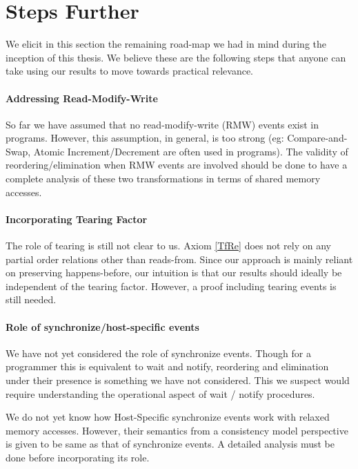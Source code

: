 \section{Steps Further}

    We elicit in this section the remaining road-map we had in mind during the inception of this thesis. 
    We believe these are the following steps that anyone can take using our results to move towards practical relevance.

    \paragraph{Addressing Read-Modify-Write}
        So far we have assumed that no read-modify-write (RMW) events exist in programs.
        However, this assumption, in general, is too strong (eg: Compare-and-Swap, Atomic Increment/Decrement are often used in programs).
        The validity of reordering/elimination when RMW events are involved should be done to have a complete analysis of these two transformations in terms of shared memory accesses.

    \paragraph{Incorporating Tearing Factor}
        The role of tearing is still not clear to us.
        Axiom \ref{TfRe} does not rely on any partial order relations other than reads-from. 
        Since our approach is mainly reliant on preserving happens-before, our intuition is that our results should ideally be independent of the tearing factor.
        However, a proof including tearing events is still needed.   
  
    \paragraph{Role of synchronize/host-specific events}
        We have not yet considered the role of synchronize events. 
        Though for a programmer this is equivalent to wait and notify, reordering and elimination under their presence is something we have not considered. 
        This we suspect would require understanding the operational aspect of wait / notify procedures.

        We do not yet know how Host-Specific synchronize events work with relaxed memory accesses.
        However, their semantics from a consistency model perspective is given to be same as that of synchronize events. 
        A detailed analysis must be done before incorporating its role. 
    
